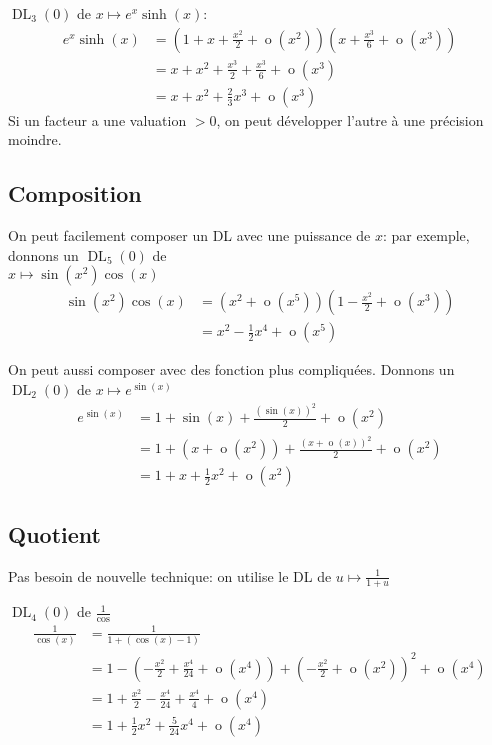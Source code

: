 \documentclass[10pt,a4paper]{article}
\theoremstyle{definition}
\DeclareMathOperator*{\negl}{o}
\DeclareMathOperator{\dl}{DL}
\begin{document}
$\dl_3(0)$ de $x \mapsto e^x \sinh(x)$:
\begin{align*}
e^x \sinh(x) &= \left(1 + x + \frac{x^2}{2} + \negl(x^2)\right)\left(x + \frac{x^3}{6} + \negl(x^3)\right) \\
&= x + x^2 + \frac{x^3}{2} + \frac{x^3}{6} + \negl(x^3) \\
&= x + x^2 + \frac{2}{3} x^3 + \negl(x^3)
\end{align*}
Si un facteur a une valuation $> 0$, on peut développer l'autre à une précision moindre.

\subsection{Composition}
On peut facilement composer un DL avec une puissance de $x$: par exemple, donnons un $\dl_5(0)$ de \\
$x \mapsto \sin(x^2) \cos(x)$
\begin{align*}
\sin(x^2) \cos(x) &= (x^2 + \negl(x^5))(1 - \frac{x^2}{2} + \negl(x^3)) \\
&= x^2 - \frac{1}{2} x^4 + \negl(x^5)
\end{align*} \medskip

On peut aussi composer avec des fonction plus compliquées. Donnons  un $\dl_2(0)$ de $x \mapsto e^{\sin(x)}$
\begin{align*}
e^{\sin(x)} &= 1 + \sin(x) + \frac{(\sin(x))^2}{2} + \negl(x^2) \\
&= 1 + (x + \negl(x^2)) + \frac{(x + \negl(x))^2}{2} + \negl(x^2) \\
&= 1 + x + \frac{1}{2} x^2 + \negl(x^2)
\end{align*}

\pagebreak

\subsection{Quotient}
Pas besoin de nouvelle technique: on utilise le DL de $u \mapsto \frac{1}{1 + u}$ \medskip

$\dl_4(0)$ de $\frac{1}{\cos}$
\begin{align*}
\frac{1}{\cos(x)} &= \frac{1}{1 + (\cos(x) - 1)} \\
&= 1 - \left(- \frac{x^2}{2} + \frac{x^4}{24} + \negl(x^4)\right) + \left(- \frac{x^2}{2} + \negl(x^2)\right)^2 + \negl(x^4) \\
&= 1 + \frac{x^2}{2} - \frac{x^4}{24} + \frac{x^4}{4} + \negl(x^4) \\
&= 1 + \frac{1}{2} x^2 + \frac{5}{24} x^4 + \negl(x^4)
\end{align*} \medskip
\end{document}
